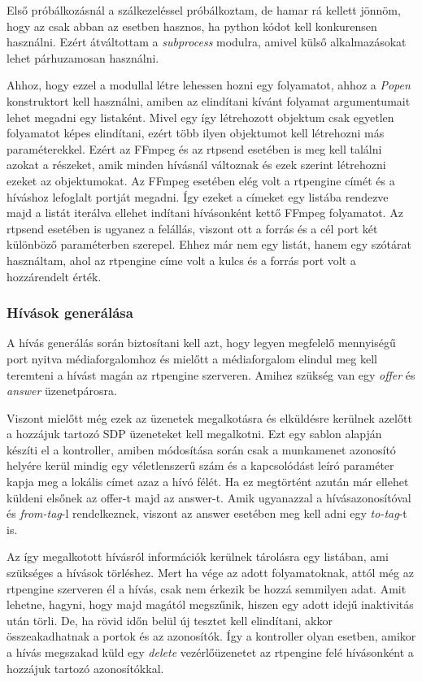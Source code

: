 Első próbálkozásnál a szálkezeléssel próbálkoztam, de hamar rá kellett jönnöm,
hogy az csak abban az esetben hasznos, ha python kódot kell konkurensen 
használni. Ezért átváltottam a \textit{subprocess} \cite{subprocess} modulra, amivel külső alkalmazásokat
lehet párhuzamosan használni.

Ahhoz, hogy ezzel a modullal létre lehessen hozni egy folyamatot, ahhoz a \textit{Popen}
konstruktort kell használni, amiben az elindítani kívánt folyamat argumentumait lehet
megadni egy listaként. Mivel egy így létrehozott objektum csak egyetlen folyamatot 
képes elindítani, ezért több ilyen objektumot kell létrehozni más paraméterekkel. Ezért
az FFmpeg és az rtpsend esetében is meg kell találni azokat a részeket, amik minden 
hívásnál változnak és ezek szerint létrehozni ezeket az objektumokat. Az FFmpeg esetében
elég volt a rtpengine címét és a híváshoz lefoglalt portját megadni. Így ezeket a címeket
egy listába rendezve majd a listát iterálva ellehet indítani hívásonként kettő
FFmpeg folyamatot. Az rtpsend esetében is ugyanez a felállás, viszont ott a forrás és 
a cél port két különböző paraméterben szerepel. Ehhez már nem egy listát, hanem egy 
szótárat használtam, ahol az rtpengine címe volt a kulcs és a forrás port volt a hozzárendelt
érték.

\subsubsection{Hívások generálása}

A hívás generálás során biztosítani kell azt, hogy legyen megfelelő mennyiségű port
nyitva médiaforgalomhoz és mielőtt a médiaforgalom elindul meg kell teremteni a hívást
magán az rtpengine szerveren. Amihez szükség van egy \textit{offer} és \textit{answer}
üzenetpárosra.

Viszont mielőtt még ezek az üzenetek megalkotásra és elküldésre kerülnek azelőtt
a hozzájuk tartozó SDP üzeneteket kell megalkotni. Ezt egy sablon alapján készíti el 
a kontroller, amiben módosítása során csak a munkamenet azonosító helyére kerül
mindig egy véletlenszerű szám és a kapcsolódást leíró paraméter kapja meg a lokális 
címet azaz a hívó félét. Ha ez megtörtént azután már ellehet küldeni elsőnek az offer-t
majd az answer-t. Amik ugyanazzal a hívásazonosítóval és \textit{from-tag}-l rendelkeznek,
viszont az answer esetében meg kell adni egy \textit{to-tag}-t is.

Az így megalkotott hívásról információk kerülnek tárolásra egy listában, ami szükséges
a hívások törléshez. Mert ha vége az adott folyamatoknak, attól még az rtpengine szerveren
él a hívás, csak nem érkezik be hozzá semmilyen adat. Amit lehetne, hagyni, hogy majd 
magától megszűnik, hiszen egy adott idejű inaktivitás után törli. De, ha rövid időn 
belül új tesztet kell elindítani, akkor összeakadhatnak a portok és az azonosítók. Így a 
kontroller olyan esetben, amikor a hívás megszakad küld egy \textit{delete} vezérlőüzenetet
az rtpengine felé hívásonként a hozzájuk tartozó azonosítókkal.
